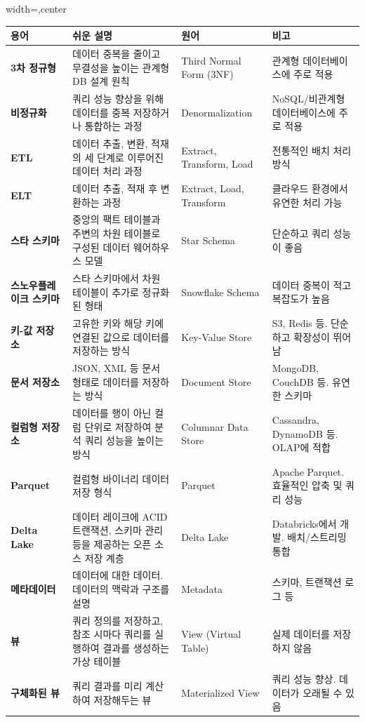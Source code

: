 \documentclass[11pt,a4paper]{article}
\theoremstyle{definition}
\begin{document}
\begin{adjustbox}{width=\textwidth,center}
\begin{tabular}{llll}
\toprule
\textbf{용어} & \textbf{쉬운 설명} & \textbf{원어} & \textbf{비고} \\
\midrule
\textbf{3차 정규형} & 데이터 중복을 줄이고 무결성을 높이는 관계형 DB 설계 원칙 & Third Normal Form (3NF) & 관계형 데이터베이스에 주로 적용 \\
\textbf{비정규화} & 쿼리 성능 향상을 위해 데이터를 중복 저장하거나 통합하는 과정 & Denormalization & NoSQL/비관계형 데이터베이스에 주로 적용 \\
\textbf{ETL} & 데이터 추출, 변환, 적재의 세 단계로 이루어진 데이터 처리 과정 & Extract, Transform, Load & 전통적인 배치 처리 방식 \\
\textbf{ELT} & 데이터 추출, 적재 후 변환하는 과정 & Extract, Load, Transform & 클라우드 환경에서 유연한 처리 가능 \\
\textbf{스타 스키마} & 중앙의 팩트 테이블과 주변의 차원 테이블로 구성된 데이터 웨어하우스 모델 & Star Schema & 단순하고 쿼리 성능이 좋음 \\
\textbf{스노우플레이크 스키마} & 스타 스키마에서 차원 테이블이 추가로 정규화된 형태 & Snowflake Schema & 데이터 중복이 적고 복잡도가 높음 \\
\textbf{키-값 저장소} & 고유한 키와 해당 키에 연결된 값으로 데이터를 저장하는 방식 & Key-Value Store & S3, Redis 등. 단순하고 확장성이 뛰어남 \\
\textbf{문서 저장소} & JSON, XML 등 문서 형태로 데이터를 저장하는 방식 & Document Store & MongoDB, CouchDB 등. 유연한 스키마 \\
\textbf{컬럼형 저장소} & 데이터를 행이 아닌 컬럼 단위로 저장하여 분석 쿼리 성능을 높이는 방식 & Columnar Data Store & Cassandra, DynamoDB 등. OLAP에 적합 \\
\textbf{Parquet} & 컬럼형 바이너리 데이터 저장 형식 & Parquet & Apache Parquet. 효율적인 압축 및 쿼리 성능 \\
\textbf{Delta Lake} & 데이터 레이크에 ACID 트랜잭션, 스키마 관리 등을 제공하는 오픈 소스 저장 계층 & Delta Lake & Databricks에서 개발. 배치/스트리밍 통합 \\
\textbf{메타데이터} & 데이터에 대한 데이터. 데이터의 맥락과 구조를 설명 & Metadata & 스키마, 트랜잭션 로그 등 \\
\textbf{뷰} & 쿼리 정의를 저장하고, 참조 시마다 쿼리를 실행하여 결과를 생성하는 가상 테이블 & View (Virtual Table) & 실제 데이터를 저장하지 않음 \\
\textbf{구체화된 뷰} & 쿼리 결과를 미리 계산하여 저장해두는 뷰 & Materialized View & 쿼리 성능 향상. 데이터가 오래될 수 있음 \\

\end{tabular}
\end{adjustbox}
\end{document}
